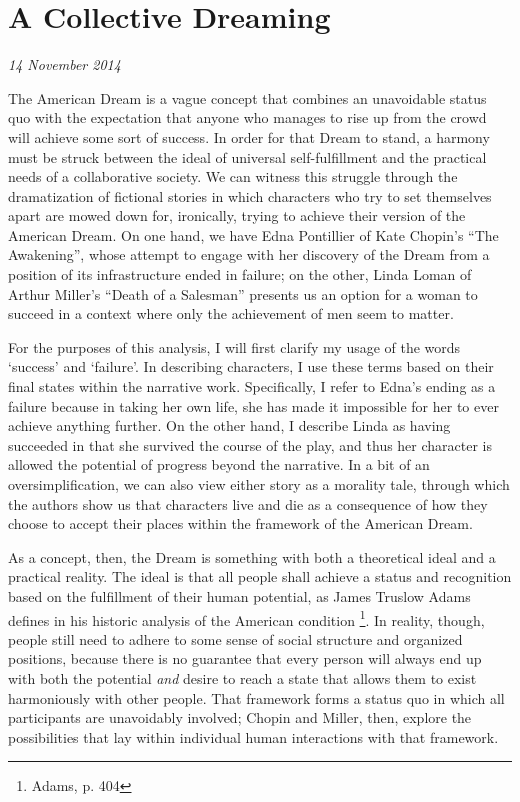 \section{A Collective Dreaming}

\textit{14 November 2014}

The American Dream is a vague concept that combines an unavoidable
status quo with the expectation that anyone who manages to rise
up from the crowd will achieve some sort of success. In order for that Dream to
stand, a harmony must be struck between the ideal of universal self-fulfillment
and the practical needs of a collaborative society.  We can witness this
struggle through the dramatization of fictional stories in which characters who
try to set themselves apart are mowed down for, ironically, trying to achieve
their version of the American Dream.  On one hand, we have Edna Pontillier of
Kate Chopin's ``The Awakening'', whose attempt to engage with her discovery of
the Dream from a position of its infrastructure ended in failure; on the other,
Linda Loman of Arthur Miller's ``Death of a Salesman''
presents us an option for a woman to succeed in a context where only the
achievement of men seem to matter.

For the purposes of this analysis, I will first clarify my usage of the words
`success' and `failure'.  In describing characters, I use these terms based on
their final states within the narrative work.  Specifically, I refer to Edna's
ending as a failure because in taking her own life, she has made it impossible
for her to ever achieve anything further.  On the other hand, I describe Linda
as having succeeded in that she survived the course of the play, and thus
her character is allowed the potential of progress beyond the narrative.  In a bit of
an oversimplification, we can also view either story as a morality tale,
through which the authors show us that characters live and die as a
consequence of how they choose to accept their places within the framework of
the American Dream.

As a concept, then, the Dream is something with both a theoretical ideal and a
practical reality.  The ideal is that all people shall achieve a status and
recognition based on the fulfillment of their human potential, as James Truslow
Adams defines in his historic analysis of the American condition
\footnote{Adams, p. 404}.  In reality, though, people still need to adhere to
some sense of social structure and organized positions, because there is no
guarantee that every person will always end up with both the potential
\textit{and}
desire to reach a state that allows them to exist harmoniously with other
people.  That framework forms a status quo in which all participants are
unavoidably involved; Chopin and Miller, then, explore the possibilities that
lay within individual human interactions with that framework.

